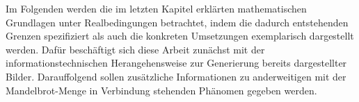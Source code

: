 
Im Folgenden werden die im letzten Kapitel erklärten mathematischen Grundlagen
unter Realbedingungen betrachtet, indem die dadurch entstehenden Grenzen
spezifiziert als auch die konkreten Umsetzungen exemplarisch dargestellt werden.
Dafür beschäftigt sich diese Arbeit zunächst mit der informationstechnischen
Herangehensweise zur Generierung bereits dargestellter Bilder.
Darauffolgend sollen zusätzliche Informationen zu anderweitigen mit der
Mandelbrot-Menge in Verbindung stehenden Phänomen gegeben werden.



